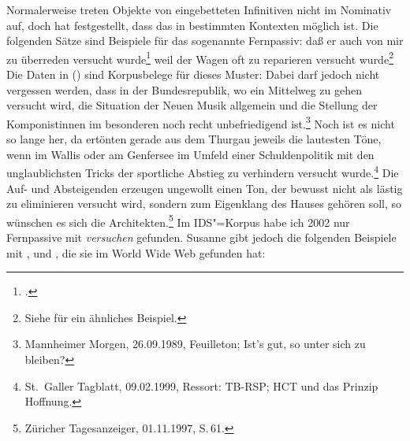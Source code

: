 Normalerweise treten Objekte von eingebetteten Infinitiven nicht im Nominativ auf,
doch  \citet[--176]{Hoehle78a} hat festgestellt, dass das in bestimmten Kontexten möglich ist.
Die folgenden Sätze sind Beispiele für das sogenannte Fernpassiv:
\eal
\ex{}
daß er auch von mir zu überreden versucht wurde\footnote{
        .%
}
\ex\label{bsp-zu-reparieren-versucht-wurde}
weil    der Wagen oft zu reparieren versucht wurde\footnote{
  Siehe  für ein ähnliches Beispiel.
}
\zl
Die Daten in () sind Korpusbelege für dieses Muster:
\eal
\ex Dabei darf jedoch nicht vergessen werden, dass in der Bundesrepublik, wo ein Mittelweg zu gehen versucht wird, 
die Situation der Neuen Musik allgemein und die Stellung der Komponistinnen im besonderen noch recht unbefriedigend ist.\footnote{
Mannheimer Morgen, 26.09.1989, Feuilleton; Ist's gut, so unter sich zu bleiben?
}
\ex Noch ist es nicht so lange her, da ertönten gerade aus dem Thurgau jeweils die lautesten Töne, 
    wenn im Wallis oder am Genfersee im Umfeld einer Schuldenpolitik mit den unglaublichsten Tricks 
    der sportliche Abstieg zu verhindern versucht wurde.\footnote{
St.\ Galler Tagblatt, 09.02.1999, Ressort: TB-RSP; HCT und das Prinzip Hoffnung.%
}
\ex Die Auf- und Absteigenden erzeugen ungewollt einen Ton,
        der bewusst nicht als lästig zu eliminieren versucht wird, 
    sondern zum Eigenklang des Hauses gehören soll, so wünschen es sich die Architekten.\footnote{
Züricher Tagesanzeiger, 01.11.1997, S.\,61.%
}
\zl
Im IDS"=Korpus habe ich 2002 nur Fernpassive mit \emph{versuchen} gefunden. Susanne
\citet{Wurmbrand2003a} gibt jedoch die folgenden Beispiele mit ,  und ,
die sie im World Wide Web gefunden hat:
